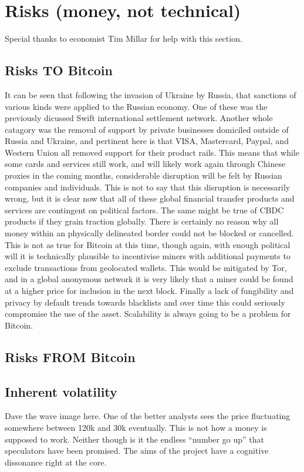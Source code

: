 \section{Risks (money, not technical)}
Special thanks to economist Tim Millar for help with this section.
\subsection{Risks TO Bitcoin}
It can be seen that following the invasion of Ukraine by Russia, that sanctions of various kinds were applied to the Russian economy. One of these was the previously dicussed Swift international settlement network. Another whole catagory was the removal of support by private businesses domiciled outside of Russia and Ukraine, and pertinent here is that VISA, Mastercard, Paypal, and Western Union all removed support for their product rails. This means that while some cards and services still work, and will likely work again through Chinese proxies in the coming months, considerable disruption will be felt by Russian companies and individuals. This is not to say that this disruption is necessarily wrong, but it is clear now that all of these global financial transfer products and services are contingent on political factors. The same might be true of CBDC products if they grain traction globally. There is certainly no reason why all money within an physically delineated border could not be blocked or cancelled. This is not as true for Bitcoin at this time, though again, with enough political will it is technically plausible to incentivise miners with additional payments to exclude transactions from geolocated wallets. This would be mitigated by Tor, and in a global anonymous network it is very likely that a miner could be found at a higher price for inclusion in the next block. Finally a lack of fungibility and privacy by default trends towards blacklists and over time this could seriously compromise the use of the asset. Scalability is always going to be a problem for Bitcoin. 
\subsection{Risks FROM Bitcoin}
\subsection{Inherent volatility}
Dave the wave image here. One of the better analysts sees the price fluctuating somewhere between 120k and 30k eventually. This is not how a money is supposed to work. Neither though is it the endless ``number go up'' that speculators have been promised. The aims of the project have a cognitive dissonance right at the core.
